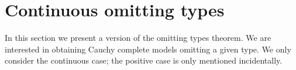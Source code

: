 \documentclass{amsproc}
\begin{document}
{\begin{comment}
  Let $a\models\{\gamma_i(z):i<\omega\}$.
  We claim that that $A,a$ does not p/c-isolate $p(x)$.
  Otherwise, by Fact~\ref{fact_isolation}, $\neg\xi_i(x,a)\rightarrow p(x)$ for some consistent $\neg\xi_i(x,a)$.
  This contradicts $a\models\gamma_{i+1}(z)$.
  
  Therefore the proof is complete if we can show that it is always possible to find the formula $\varphi(x)$ required in (2).
  
  Suppose for a contradiction that $\neg\xi_i(x,z)\wedge\gamma_i(z)$ is consistent while (\#) is inconsistent for all formulas $\varphi(x)\in p$.
  This immediately implies that 
  
  \ceq{\hfill\exists z\;\big[\neg\xi_i(x,z)\wedge\neg\tilde{\gamma}(z)\big]}{\rightarrow}{p(x).}
  
  By Fact~\ref{fact_isolation}, $p(x)$ is p/c-isolated, a contradiction.
\end{proof}

From the lemma we easily obtain an omitting types theorem for positive types that is very close to the classical one.

\begin{theorem}[Positive Omitting Types]\label{thm_pOTT}
  Let ${\EuScript F}^{\rm p}$ be separable.
  Let $A$ be countable.
  Assume also that $p(x)\subseteq{\EuScript F}^{\rm p}(A)$ is not p-isolated.
  Then there is a p-model $M$ containing $A$ that omits $p(x)$. 
\end{theorem}

\begin{proof}
  As in the classical proof, appy the lemma above and the Tarski-Vaught test (Theorem~\ref{thm_Tarski_Vaught}) to obtain a countable p-model $M$ that does not isolate $p(x)$.
  For p-models, p-isolating a type is equivalent to  realizing it.
\end{proof}
\end{comment}

\section{Continuous omitting types}

\def\ceq#1#2#3{\parbox[t]{25ex}{$\displaystyle #1$}\parbox{6ex}{\hfil $#2$}{$\displaystyle #3$}}

In this section we present a version of the omitting types theorem.
We are interested in obtaining Cauchy complete models omitting a given type.
We only consider the continuous case; the positive case is only mentioned incidentally.

}
\end{document}
